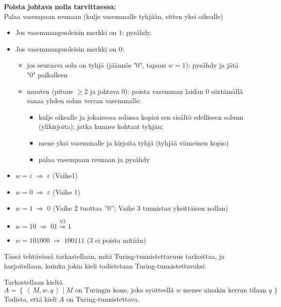 \documentclass[12pt,a4paper]{article}
\newcommand{\set}[1]{\left\{\,#1\,\right\}}
\newcommand{\code}[1]{\left\langle\,#1\,\right\rangle}
\begin{document}
\begin{alakohta}
\pagebreak
\item{\bf Poista johtava nolla tarvittaessa:}\\
Palaa vasempaan reunaan (kulje vasemmalle tyhjään, sitten yksi oikealle)
\begin{itemize}
  \item Jos vasemmanpuoleisin merkki on $1$: pysähdy.
  \item Jos vasemmanpuoleisin merkki on $0$:
    \begin{itemize}
      \item jos seuraava solu on tyhjä (jäännös "0", tapaus $w=1$): pysähdy ja jätä "0" paikalleen
      \item muuten (pituus $\ge 2$ ja johtava 0): poista vasemman laidan 0 siirtämällä sanaa yhden solun verran vasemmalle:
        \begin{itemize}
          \item kulje oikealle ja jokaisessa solussa kopioi sen sisältö edelliseen soluun (ylikirjoita); jatka kunnes kohtaat tyhjän;
          \item mene yksi vasemmalle ja kirjoita tyhjä (tyhjää viimeinen kopio)
          \item palaa vasempaan reunaan ja pysähdy
        \end{itemize}
    \end{itemize}
\end{itemize}
\end{alakohta}

\medskip
{}
\begin{itemize}
  \item $w=\varepsilon \;\Rightarrow\; \varepsilon$ (Vaihe1)
  \item $w=0 \;\Rightarrow\; \varepsilon$ (Vaihe 1)
  \item $w=1 \;\Rightarrow\; 0$ (Vaihe 2 tuottaa ”0”; Vaihe 3 tunnistaa yksittäisen nollan)
  \item $w=10 \;\Rightarrow\; 01 \stackrel{\text{V3}}{\Rightarrow} 1$
  \item $w=101000 \;\Rightarrow\; 100111$ (3 ei poista mitään)
\end{itemize}





\pagebreak
{}Tässä tehtävässä tarkastellaan, mitä Turing-tunnistettavuus tarkoittaa, ja harjoitellaan, kuinka jokin kieli todistetaan Turing-tunnistettavaksi.

    Tarkastellaan kieltä
\[A=\set{\code{M,w,q}\mid
\mbox{$M$ on Turingin kone, joka syötteellä $w$ menee ainakin kerran
tilaan $q$}}.\]
Todista, että kieli $A$ on Turing-tunnistettava.
\end{document}
